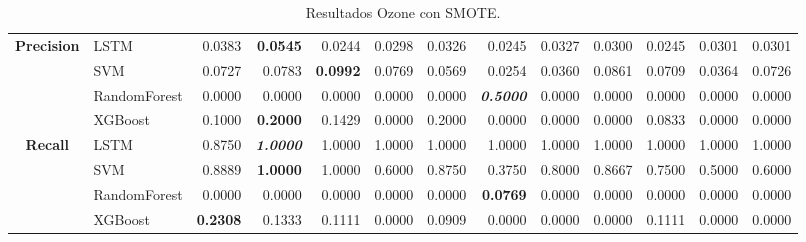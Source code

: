 \begin{table}[H]
\begin{adjustbox}{max width=14cm}
\begin{tabular}{|c|l|r|r|r|r|r|r|r|r|r|r|r|}
			\hline
			\textbf{Precision} &  LSTM &  0.0383 & \textbf{  0.0545 } &  0.0244 &  0.0298 &  0.0326 &  0.0245 &  0.0327 &  0.0300 &  0.0245 &  0.0301 &  0.0301 \\
			&  SVM &  0.0727 &  0.0783 & \textbf{  0.0992 } &  0.0769 &  0.0569 &  0.0254 &  0.0360 &  0.0861 &  0.0709 &  0.0364 &  0.0726 \\
			&  RandomForest &  0.0000 &  0.0000 &  0.0000 &  0.0000 &  0.0000 & \textit{ \textbf{  0.5000 } } &  0.0000 &  0.0000 &  0.0000 &  0.0000 &  0.0000 \\
			&  XGBoost &  0.1000 & \textbf{  0.2000 } &  0.1429 &  0.0000 &  0.2000 &  0.0000 &  0.0000 &  0.0000 &  0.0833 &  0.0000 &  0.0000 \\
			\hline
			\textbf{Recall} &  LSTM &  0.8750 & \textit{ \textbf{  1.0000 } } &  1.0000 &  1.0000 &  1.0000 &  1.0000 &  1.0000 &  1.0000 &  1.0000 &  1.0000 &  1.0000 \\
			&  SVM &  0.8889 & \textbf{  1.0000 } &  1.0000 &  0.6000 &  0.8750 &  0.3750 &  0.8000 &  0.8667 &  0.7500 &  0.5000 &  0.6000 \\
			&  RandomForest &  0.0000 &  0.0000 &  0.0000 &  0.0000 &  0.0000 & \textbf{  0.0769 } &  0.0000 &  0.0000 &  0.0000 &  0.0000 &  0.0000 \\
			&  XGBoost & \textbf{  0.2308 } &  0.1333 &  0.1111 &  0.0000 &  0.0909 &  0.0000 &  0.0000 &  0.0000 &  0.1111 &  0.0000 &  0.0000 \\
			\hline
		\end{tabular}
	\end{adjustbox}
	\caption{Resultados Ozone con SMOTE.}
	\label{tab:Ozone_SMOTE}
\end{table}

